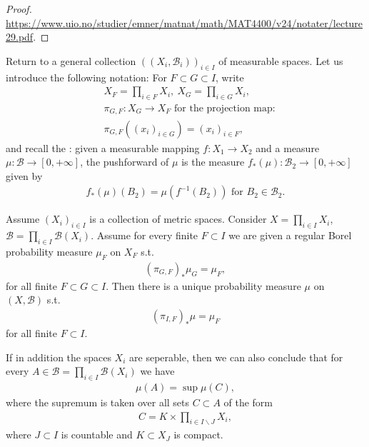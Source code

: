 \ifdetailed 
\begin{proof}
    \url{https://www.uio.no/studier/emner/matnat/math/MAT4400/v24/notater/lecture29.pdf}.
\end{proof}
\fi 
Return to a general collection \(((X_i,\mathscr{B}_i))_{i\in I}\) of measurable spaces. Let us introduce the following notation: For \(F\subset G\subset I\), write 
\begin{align*}
    &X_F = \prod\limits_{i\in F} X_i, \ X_G = \prod\limits_{i\in G} X_i, \\
    &\pi_{G,F}:X_G\rightarrow X_F \text{ for the projection map:}\\
    &\pi_{G,F}((x_i)_{i\in G}) = (x_i)_{i\in F},
\end{align*}
and recall the : given a measurable mapping \(f:X_1\rightarrow X_2\) and a measure \(\mu:\mathscr{B}\rightarrow [0,+\infty]\), the pushforward of \(\mu\) is the measure \(f_{*}(\mu):\mathscr{B}_2\rightarrow[0,+\infty] \) given by
\begin{align*}
    f_{*}(\mu)(B_2) = \mu\left(f^{-1}(B_2)\right) \text{ for } B_2\in\mathscr{B}_2.
\end{align*}
\begin{theorem}
    Assume \((X_i)_{i\in I}\) is a collection of metric spaces. Consider \(X=\prod_{i\in I}X_i\), \(\mathscr{B}=\prod_{i\in I}\mathscr{B}(X_i)\). Assume for every finite \(F\subset I\) we are given a regular Borel probability measure \(\mu_F\) on \(X_F\) s.t. 
    \begin{align*}
        (\pi_{G,F})_{*}\mu_G = \mu_F,
    \end{align*}
    for all finite \(F\subset G\subset I\). Then there is a unique probability measure \(\mu\) on \((X,\mathscr{B})\) s.t. 
    \begin{align*}
        (\pi_{I,F})_{*}\mu = \mu_F
    \end{align*}
    for all finite \(F\subset I\).
\end{theorem}
\begin{remark}
    If in addition the spaces \(X_i\) are seperable, then we can also conclude that for every \(A\in\mathscr{B}=\prod_{i\in I}\mathscr{B}(X_i)\) we have
    \begin{align*}
        \mu(A) = \sup\mu(C),
    \end{align*}
    where the supremum is taken over all sets \(C\subset A\) of the form 
    \begin{align*}
        C=K\times\prod\limits_{i\in I\backslash J} X_i,
    \end{align*}
    where \(J\subset I\) is countable and \(K\subset X_J\) is compact. 
\end{remark}